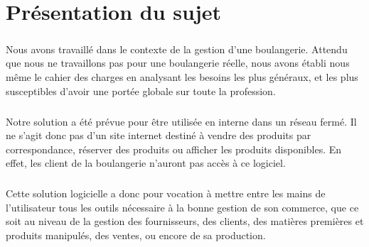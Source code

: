 \chapter{Présentation du sujet}

\paragraph{}
    Nous avons travaillé dans le contexte de la gestion d'une boulangerie.
    Attendu que nous ne travaillons pas pour une boulangerie réelle, nous avons
    établi nous même le cahier des charges en analysant les besoins les plus
    généraux, et les plus susceptibles d'avoir une portée globale sur toute
    la profession.
\paragraph{}
    Notre solution a été prévue pour être utilisée en interne dans un réseau
    fermé. Il ne s'agit donc pas d'un site internet destiné à vendre des
    produits par correspondance, réserver des produits ou afficher les produits
    disponibles. En effet, les client de la boulangerie n'auront pas accès à ce
    logiciel.
\paragraph{}
    Cette solution logicielle a donc pour vocation à mettre entre les mains de 
    l'utilisateur tous les outils nécessaire à la bonne gestion de son
    commerce, que ce soit au niveau de la gestion des fournisseurs, des
    clients, des matières premières et produits manipulés, des ventes,
    ou encore de sa production.
